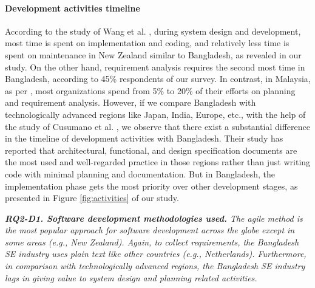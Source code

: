\paragraph{Development activities timeline}
According to the study of Wang et al. \citep{Wang2018}, during system design and development, most time is spent on implementation and coding, and relatively less time is spent on maintenance in New Zealand similar to Bangladesh, as revealed in our study. On the other hand, requirement analysis requires the second most time in Bangladesh, according to 45\% respondents of our survey. In contrast, in Malaysia, as per \citep{Baharom2006}, most organizations spend from 5\% to 20\% of their efforts on planning and requirement analysis. However, if we compare Bangladesh with technologically advanced regions like Japan, India, Europe, etc., with the help of the study of Cusumano et al. \citep{Cusumano2003}, we observe that there exist a substantial difference in the timeline of development activities with Bangladesh. Their study has reported that architectural, functional, and design specification documents are the most used and well-regarded practice in those regions rather than just writing code with minimal planning and documentation. But in Bangladesh, the implementation phase gets the most priority over other development stages, as presented in Figure \ref{fig:activities} of our study.

\begin{tcolorbox}[flushleft upper,boxrule=1pt,arc=0pt,left=0pt,right=0pt,top=0pt,bottom=0pt,colback=white,after=\ignorespacesafterend\par\noindent]
\nd\it{\bf{RQ2-D1. Software development methodologies used.}}
The agile method is the most popular approach for software development across the globe except in some areas (e.g., New Zealand).
Again, to collect requirements, the Bangladesh SE industry uses plain text like other countries (e.g., Netherlands).
Furthermore, in comparison with technologically advanced regions, the Bangladesh SE industry lags in giving value to system design and planning related activities.
 
\end{tcolorbox}